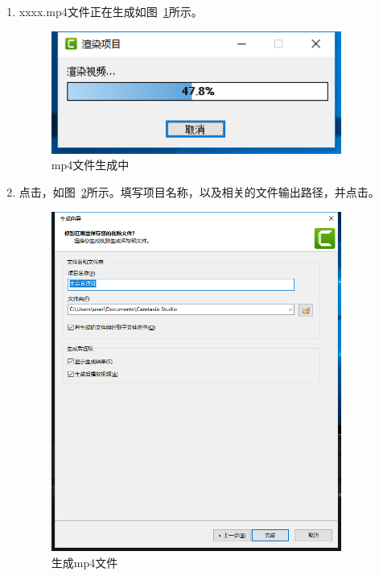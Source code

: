 \documentclass[12pt]{ctexart}
\begin{document}
\begin{enumerate}
 \item xxxx.mp4文件正在生成如图~\ref{fig:07.jpg}所示。
     \begin{figure}
    \centering
    \includegraphics[width=0.9\textwidth]{07.jpg}
    \caption{mp4文件生成中}
    \label{fig:07.jpg}
    \end{figure}
 
 
\item 点击{\color{blue}{下一步}}，如图~\ref{fig:06.jpg}所示。填写项目名称，以及相关的文件输出路径，并点击{\color{blue}{完成}}。\par
     \begin{figure}
    \centering
    \includegraphics[width=0.9\textwidth]{06.jpg}
    \caption{生成mp4文件}
    \label{fig:06.jpg}
    \end{figure}
\end{enumerate}
\end{document}
